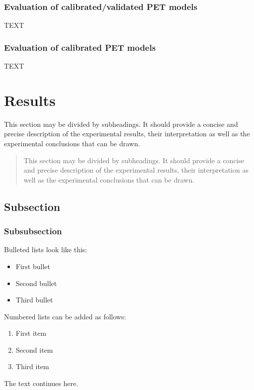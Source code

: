 \documentclass[hydrology,article,submit,moreauthors,pdftex]{Definitions/mdpi}
\begin{document}
\subsubsection{Evaluation of calibrated/validated PET models}
TEXT


\subsubsection{Evaluation of calibrated PET models}
TEXT 
\section{Results}

This section may be divided by subheadings. It should provide a concise and precise description of the experimental results, their interpretation as well as the experimental conclusions that can be drawn.
\begin{quote}
This section may be divided by subheadings. It should provide a concise and precise description of the experimental results, their interpretation as well as the experimental conclusions that can be drawn.
\end{quote}

\subsection{Subsection}
\unskip
\subsubsection{Subsubsection}

Bulleted lists look like this:
\begin{itemize}[leftmargin=*,labelsep=5.8mm]
\item	First bullet
\item	Second bullet
\item	Third bullet
\end{itemize}

Numbered lists can be added as follows:
\begin{enumerate}[leftmargin=*,labelsep=4.9mm]
\item	First item 
\item	Second item
\item	Third item
\end{enumerate}

The text continues here.
\end{document}
